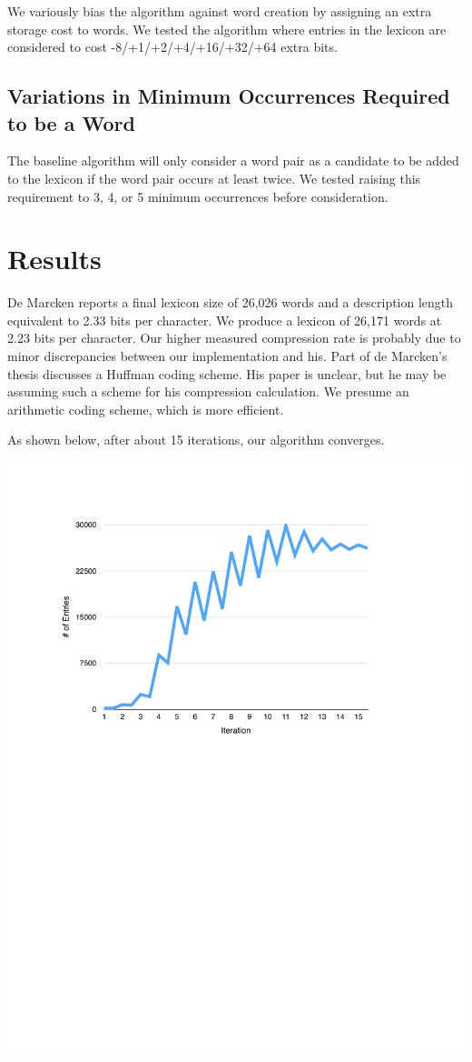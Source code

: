 \documentclass[11pt, oneside, fleqn]{article}
\begin{document}
	We variously bias the algorithm against word creation by assigning an extra storage cost to words. We tested the algorithm where entries in the lexicon are considered to cost -8/+1/+2/+4/+16/+32/+64 extra bits.

	\subsection{Variations in Minimum Occurrences Required to be a Word}
	
	The baseline algorithm will only consider a word pair as a candidate to be added to the lexicon if the word pair occurs at least twice. We tested raising this requirement to 3, 4, or 5 minimum occurrences before consideration.
 
   \section{Results}
   
   De Marcken reports a final lexicon size of 26,026 words and a description length equivalent to 2.33 bits per character. We produce a lexicon of 26,171 words at 2.23 bits per character. Our higher measured compression rate is probably due to minor discrepancies between our implementation and his. Part of de Marcken's thesis discusses a Huffman coding scheme. His paper is unclear, but he may be assuming such a scheme for his compression calculation. We presume an arithmetic coding scheme, which is more efficient.
   
   As shown below, after about 15 iterations, our algorithm converges.

  \includegraphics[scale=0.9]{./figure/lexicon_size_per_iteration}
\end{document}
